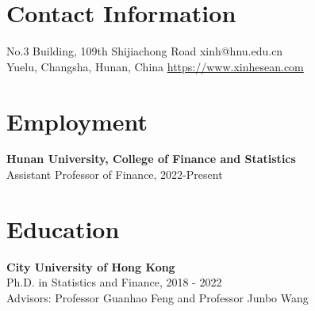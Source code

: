 \documentclass[margin]{res}
\begin{document}
\begin{resume}




\section{\sc Contact Information}
	No.3 Building, 109th Shijiachong Road	   \hfill xinh@hnu.edu.cn\\        
	Yuelu, Changsha, Hunan, China 	\hfill   \url{https://www.xinhesean.com} \\

\vspace{5mm}

\section{\sc Employment}
\textbf{Hunan University, College of Finance and Statistics}\\
{Assistant Professor of Finance, 2022-Present}\\

\vspace{5mm}

\section{\sc Education}
\textbf{City University of Hong Kong}\\
{Ph.D. in Statistics and Finance, 2018 - 2022}\\
Advisors: Professor Guanhao Feng and Professor Junbo Wang


\end{resume}
\end{document}
